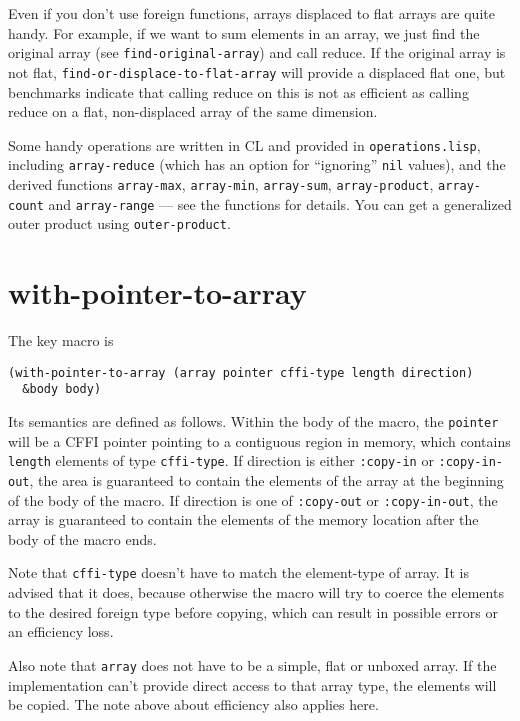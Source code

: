 \documentclass[12pt,a4paper,dvipdfm]{article}
\begin{document}
Even if you don't use foreign functions, arrays displaced to flat
arrays are quite handy.  For example, if we want to sum elements in an
array, we just find the original array (see
\lstinline!find-original-array!) and call reduce.  If the original
array is not flat, \lstinline!find-or-displace-to-flat-array! will
provide a displaced flat one, but benchmarks indicate that calling
reduce on this is not as efficient as calling reduce on a flat,
non-displaced array of the same dimension.

Some handy operations are written in CL and provided in
\verb!operations.lisp!, including \lstinline!array-reduce! (which has
an option for ``ignoring'' \lstinline!nil! values), and the derived
functions \lstinline!array-max!, \lstinline!array-min!,
\lstinline!array-sum!, \lstinline!array-product!,
\lstinline!array-count! and \lstinline!array-range! --- see the
functions for details.  You can get a generalized outer product using
\lstinline!outer-product!.


\section{with-pointer-to-array}
\label{sec:with-pointer-array}

The key macro is 
\begin{lstlisting}
(with-pointer-to-array (array pointer cffi-type length direction)
  &body body)
\end{lstlisting}

Its semantics are defined as follows.  Within the body of the macro,
the \lstinline!pointer! will be a CFFI pointer pointing to a
contiguous region in memory, which contains \lstinline!length!
elements of type \lstinline!cffi-type!.  If direction is either
\lstinline!:copy-in! or \lstinline!:copy-in-out!, the area is
guaranteed to contain the elements of the array at the beginning of
the body of the macro.  If direction is one of \lstinline!:copy-out!
or \lstinline!:copy-in-out!, the array is guaranteed to contain the
elements of the memory location after the body of the macro ends.

Note that \lstinline!cffi-type! doesn't have to match the element-type
of array.  It is advised that it does, because otherwise the macro
will try to coerce the elements to the desired foreign type before
copying, which can result in possible errors or an efficiency loss.

Also note that \lstinline!array! does not have to be a simple, flat or
unboxed array.  If the implementation can't provide direct access to
that array type, the elements will be copied.  The note above about
efficiency also applies here.
\end{document}

